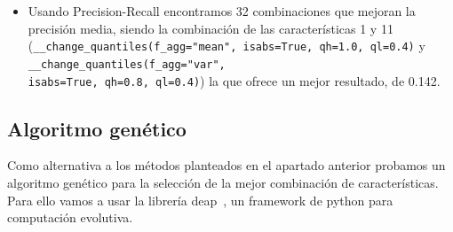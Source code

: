 \documentclass[a4paper,12pt,twoside,oldfontcommands]{memoir}
\begin{document}
\begin{itemize}
\begin{itemize}
        \item Usando Precision-Recall encontramos 32 combinaciones que mejoran la precisión media, siendo la combinación de las características 1 y 11 (\texttt{\_\_change\_quantiles(f\_agg="mean", isabs=True, qh=1.0, ql=0.4)} y \texttt{\_\_change\_quantiles(f\_agg="var",\\ isabs=True, qh=0.8, ql=0.4)}) la que ofrece un mejor resultado, de 0.142. 
    \end{itemize}
\end{itemize}

\subsection{Algoritmo genético}
Como alternativa a los métodos planteados en el apartado anterior probamos un algoritmo genético para la selección de la mejor combinación de características. Para ello vamos a usar la librería  deap~\cite{DEAP_JMLR2012}, un framework de python para computación evolutiva. 
\end{document}
